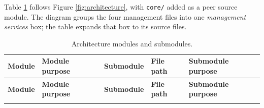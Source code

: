 \documentclass[13pt, a4paper]{article}
\begin{document}
Table \ref{tab:diagram-modules} follows Figure \ref{fig:architecture}, with
\texttt{core/} added as a peer source module. The diagram groups the four management files
into one \textit{management services} box; the table expands that box to its source files.

\small
\begin{longtable}{@{}p{}p{}p{}p{}p{}@{}}
\caption{Architecture modules and submodules.}\label{tab:diagram-modules}\\
\toprule
\textbf{Module} & \textbf{Module purpose} & \textbf{Submodule} & \textbf{File path} & \textbf{Submodule purpose} \\
\midrule
\endfirsthead
\toprule
\textbf{Module} & \textbf{Module purpose} & \textbf{Submodule} & \textbf{File path} & \textbf{Submodule purpose} \\
\midrule
\endhead
\bottomrule
\endfoot


\end{longtable}
\end{document}
